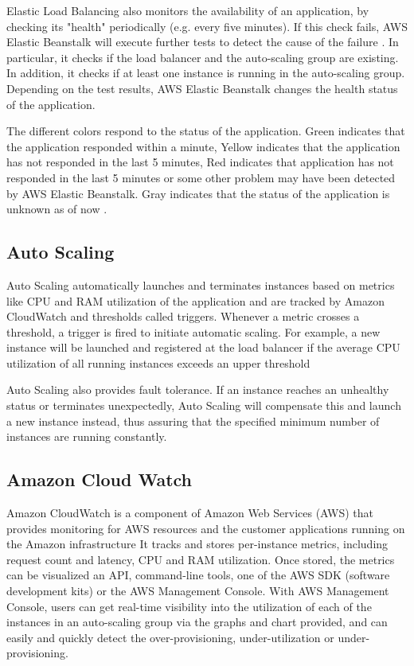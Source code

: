 \documentclass[9pt,twocolumn,twoside]{../../styles/osajnl}
\begin{document}
Elastic Load Balancing also monitors the availability of an
application, by checking its "health" periodically (e.g. every five
minutes). If this check fails, AWS Elastic Beanstalk will execute
further tests to detect the cause of the failure
\cite{elastic-loadbalancing}. In particular, it checks if the load
balancer and the auto-scaling group are existing.  In addition, it
checks if at least one instance is running in the auto-scaling
group. Depending on the test results, AWS Elastic Beanstalk changes
the health status of the application.
    
The different colors respond to the status of the application. Green
indicates that the application responded within a minute, Yellow
indicates that the application has not responded in the last 5
minutes, Red indicates that application has not responded in the last
5 minutes or some other problem may have been detected by AWS Elastic
Beanstalk. Gray indicates that the status of the application is
unknown as of now \cite{elastic-loadbalancing}.

\subsection{Auto Scaling}

Auto Scaling automatically launches and terminates instances based on
metrics like CPU and RAM utilization of the application and are
tracked by Amazon CloudWatch and thresholds called triggers. Whenever
a metric crosses a threshold, a trigger is fired to initiate automatic
scaling.  For example, a new instance will be launched and registered
at the load balancer if the average CPU utilization of all running
instances exceeds an upper threshold
    
Auto Scaling also provides fault tolerance. If an instance reaches an
unhealthy status or terminates unexpectedly, Auto Scaling will
compensate this and launch a new instance instead, thus assuring that
the specified minimum number of instances are running constantly.

\subsection{Amazon Cloud Watch}

Amazon CloudWatch is a component of Amazon Web Services (AWS) that
provides monitoring for AWS resources and the customer applications
running on the Amazon infrastructure \cite{elastic-cloudwatch}  It tracks and stores
per-instance metrics, including request count and latency, CPU and RAM
utilization.  Once stored, the metrics can be visualized an API,
command-line tools, one of the AWS SDK (software development kits) or
the AWS Management Console. With AWS Management Console, users can
get real-time visibility into the utilization of each of the instances
in an auto-scaling group via the graphs and chart provided, and can
easily and quickly detect the over-provisioning, under-utilization or
under-provisioning.
\end{document}
